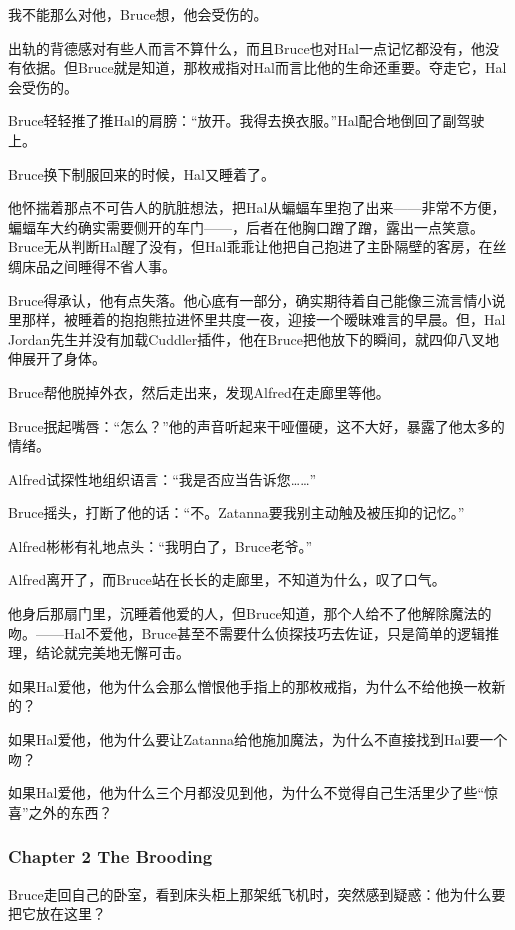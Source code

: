 \documentclass[../main.tex]{subfiles}
\begin{document}
我不能那么对他，Bruce想，他会受伤的。

出轨的背德感对有些人而言不算什么，而且Bruce也对Hal一点记忆都没有，他没有依据。但Bruce就是知道，那枚戒指对Hal而言比他的生命还重要。夺走它，Hal会受伤的。

Bruce轻轻推了推Hal的肩膀：“放开。我得去换衣服。”Hal配合地倒回了副驾驶上。

Bruce换下制服回来的时候，Hal又睡着了。

他怀揣着那点不可告人的肮脏想法，把Hal从蝙蝠车里抱了出来——非常不方便，蝙蝠车大约确实需要侧开的车门——，后者在他胸口蹭了蹭，露出一点笑意。Bruce无从判断Hal醒了没有，但Hal乖乖让他把自己抱进了主卧隔壁的客房，在丝绸床品之间睡得不省人事。

Bruce得承认，他有点失落。他心底有一部分，确实期待着自己能像三流言情小说里那样，被睡着的抱抱熊拉进怀里共度一夜，迎接一个暧昧难言的早晨。但，Hal
Jordan先生并没有加载Cuddler插件，他在Bruce把他放下的瞬间，就四仰八叉地伸展开了身体。

Bruce帮他脱掉外衣，然后走出来，发现Alfred在走廊里等他。

Bruce抿起嘴唇：“怎么？”他的声音听起来干哑僵硬，这不大好，暴露了他太多的情绪。

Alfred试探性地组织语言：“我是否应当告诉您\ldots\ldots”

Bruce摇头，打断了他的话：“不。Zatanna要我别主动触及被压抑的记忆。”

Alfred彬彬有礼地点头：“我明白了，Bruce老爷。”

Alfred离开了，而Bruce站在长长的走廊里，不知道为什么，叹了口气。

他身后那扇门里，沉睡着他爱的人，但Bruce知道，那个人给不了他解除魔法的吻。——Hal不爱他，Bruce甚至不需要什么侦探技巧去佐证，只是简单的逻辑推理，结论就完美地无懈可击。

如果Hal爱他，他为什么会那么憎恨他手指上的那枚戒指，为什么不给他换一枚新的？

如果Hal爱他，他为什么要让Zatanna给他施加魔法，为什么不直接找到Hal要一个吻？

如果Hal爱他，他为什么三个月都没见到他，为什么不觉得自己生活里少了些“惊喜”之外的东西？

\hypertarget{chapter-2-the-brooding}{%
  \subsubsection{Chapter 2 The Brooding}\label{chapter-2-the-brooding}}

Bruce走回自己的卧室，看到床头柜上那架纸飞机时，突然感到疑惑：他为什么要把它放在这里？
\end{document}
